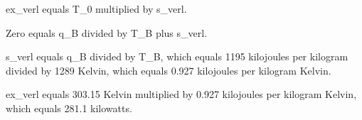 ex_verl equals T_0 multiplied by s_verl.  

Zero equals q_B divided by T_B plus s_verl.  

s_verl equals q_B divided by T_B, which equals 1195 kilojoules per kilogram divided by 1289 Kelvin, which equals 0.927 kilojoules per kilogram Kelvin.  

ex_verl equals 303.15 Kelvin multiplied by 0.927 kilojoules per kilogram Kelvin, which equals 281.1 kilowatts.